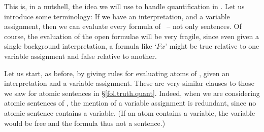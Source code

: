 \begin{earg}
This is, in a nutshell, the idea we will use to handle quantification in \FOL. Let us introduce some terminology:   
If we have an interpretation, and a variable assignment, then we can evaluate every formula of \FOL\ – not only sentences. Of course, the evaluation of the open formulae will be very fragile, since even given a single background interpretation, a formula like `$Fx$' might be true relative to one variable assignment and false relative to another. 

Let us start, as before, by giving rules for evaluating atoms of \FOL, given an interpretation and a variable assignment.  These are very similar clauses to those we saw for atomic sentences in §\ref{fol.truth.quant}. Indeed, when we are considering atomic sentences of \FOL, the mention of a variable assignment is redundant, since no atomic sentence contains a variable. (If an atom contains a variable, the variable would be free and the formula thus not a sentence.)


\end{earg}
